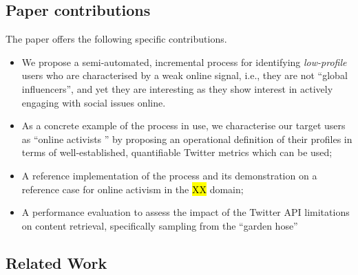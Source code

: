 \documentclass[runningheads]{llncs}
\begin{document}




\subsection{Paper contributions}

The paper offers the following specific contributions.
\begin{itemize}
\item We propose a semi-automated, incremental process for identifying \textit{low-profile} users who are characterised by a weak online signal, i.e., they are not ``global influencers'', and yet they are interesting as they show interest in actively engaging with social issues online. 

\item As a concrete example of the process in use, we characterise our target users as ``online activists '' by proposing an operational definition of their profiles in terms of well-established, quantifiable Twitter metrics which can be used;

\item A reference implementation of the process and its demonstration on a reference case for online activism in the \hl{XX} domain;

\item A performance evaluation to assess the impact of the Twitter API limitations on content retrieval, specifically sampling from the ``garden hose'' 

\end{itemize}

\subsection{Related Work}
\end{document}
